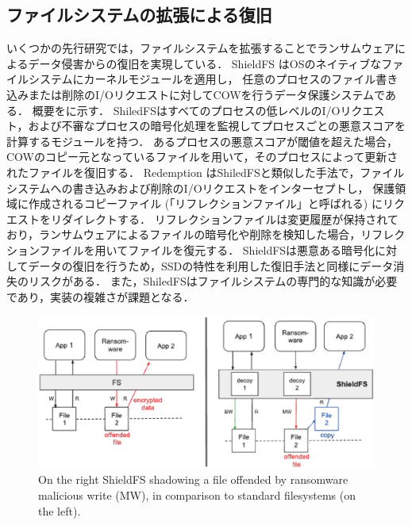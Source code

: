 \subsection{ファイルシステムの拡張による復旧}
いくつかの先行研究では，ファイルシステムを拡張することでランサムウェアによるデータ侵害からの復旧を実現している．
ShieldFS \cite{shieldFS} はOSのネイティブなファイルシステムにカーネルモジュールを適用し，
任意のプロセスのファイル書き込みまたは削除のI/Oリクエストに対してCOWを行うデータ保護システムである．
概要をに示す．
ShiledFSはすべてのプロセスの低レベルのI/Oリクエスト，および不審なプロセスの暗号化処理を監視してプロセスごとの悪意スコアを計算するモジュールを持つ．
あるプロセスの悪意スコアが閾値を超えた場合，COWのコピー元となっているファイルを用いて，そのプロセスによって更新されたファイルを復旧する．
Redemption \cite{kharraz2017redemption} はShiledFSと類似した手法で，ファイルシステムへの書き込みおよび削除のI/Oリクエストをインターセプトし，
保護領域に作成されるコピーファイル (「リフレクションファイル」と呼ばれる) にリクエストをリダイレクトする．
リフレクションファイルは変更履歴が保持されており，ランサムウェアによるファイルの暗号化や削除を検知した場合，リフレクションファイルを用いてファイルを復元する．
ShieldFSは悪意ある暗号化に対してデータの復旧を行うため，SSDの特性を利用した復旧手法と同様にデータ消失のリスクがある．
また，ShiledFSはファイルシステムの専門的な知識が必要であり，実装の複雑さが課題となる．
\begin{figure}[t]
  \begin{center}
    \includegraphics[width=\columnwidth]{doc/img/shieldFS.eps}
  \end{center}
  \caption{On the right ShieldFS shadowing a file offended by ransomware malicious write (MW), in comparison to standard filesystems (on the left). \cite{shieldFS}}
  \label{fig:shieldFS}
\end{figure}

